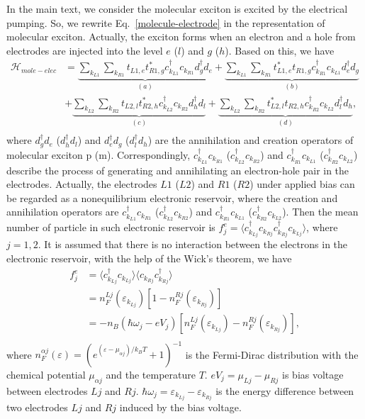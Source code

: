 \documentclass[aps,prb,
superscriptaddress,
,floatfix,footinbib,longbibliography,
preprint
]{revtex4-2}
\begin{document}
{In the main text, we consider the molecular exciton is excited by the electrical pumping. So, we rewrite Eq.~\ref{molecule-electrode} in the representation of molecular exciton. Actually, the exciton forms when an electron and a hole from electrodes are injected into the level $e$ ($l$) and $g$ ($h$). Based on this, we have
\begin{equation}
\begin{split}
\mathcal{H}_{mole-elec}&=\underbrace{\sum_{k_{L1}}\sum_{k_{R1}}t_{L1,e}t_{R1,g}^{\ast}c_{k_{L1}}^{\dagger}c_{k_{R1}}d_{g}^{\dagger}d_{e}}_{(a)}+\underbrace{\sum_{k_{L1}}\sum_{k_{R1}}t_{L1,e}^{\ast}t_{R1,g}c_{k_{R1}}^{\dagger}c_{k_{L1}}d_{e}^{\dagger}d_{g}}_{(b)}\\
&+\underbrace{\sum_{k_{L2}}\sum_{k_{R2}}t_{L2,l}t_{R2,h}^{\ast}c_{k_{L2}}^{\dagger}c_{k_{R2}}d_{h}^{\dagger}d_{l}}_{(c)}+\underbrace{\sum_{k_{L2}}\sum_{k_{R2}}t_{L2,l}^{\ast}t_{R2,h}c_{k_{R2}}^{\dagger}c_{k_{L2}}d_{l}^{\dagger}d_{h}}_{(d)},\\
\end{split}
\label{exciton-electrode}
\end{equation}
where $d_{g}^{\dagger}d_{e}$ ($d_{h}^{\dagger}d_{l}$) and $d_{e}^{\dagger}d_{g}$ ($d_{l}^{\dagger}d_{h}$) are the annihilation and creation operators of molecular exciton p (m). Correspondingly, $c_{k_{L1}}^{\dagger}c_{k_{R1}}$ ($c_{k_{L2}}^{\dagger}c_{k_{R2}}$) and  $c_{k_{R1}}^{\dagger}c_{k_{L1}}$ ($c_{k_{R2}}^{\dagger}c_{k_{L2}}$) describe the process of generating and annihilating an electron-hole pair in the electrodes. Actually, the electrodes $L1$ ($L2$) and $R1$ ($R2$) under applied bias can be regarded as a nonequilibrium electronic reservoir, where the creation and annihilation operators are $c_{k_{L1}}^{\dagger}c_{k_{R1}}$ ($c_{k_{L2}}^{\dagger}c_{k_{R2}}$) and  $c_{k_{R1}}^{\dagger}c_{k_{L1}}$ ($c_{k_{R2}}^{\dagger}c_{k_{L2}}$). Then the mean number of particle in such electronic reservoir is $f_{j}^{e}=\langle c_{k_{Lj}}^{\dagger}c_{k_{Rj}} c_{k_{Rj}}^{\dagger}c_{k_{Lj}}\rangle$, where $j=1,2$. It is assumed that there is no interaction between the electrons in the electronic reservoir, with the help of the Wick's theorem, we have
\begin{equation}
\begin{split}
f_{j}^{e}&=
\langle c_{k_{Lj}}^{\dagger}c_{k_{Lj}}\rangle \langle c_{k_{Rj}} c_{k_{Rj}}^{\dagger}\rangle\\
&=n_{F}^{Lj}(\varepsilon_{k_{Lj}})[1-n_{F}^{Rj}(\varepsilon_{k_{Rj}})]\\
&=-n_{B}(\hbar\omega_{j}-eV_{j})[n_{F}^{Lj}(\varepsilon_{k_{Lj}})-n_{F}^{Rj}(\varepsilon_{k_{Rj}})],\\
\end{split}
\end{equation}
where $n_{F}^{\alpha j}(\varepsilon)=(e^{(\varepsilon-\mu_{\alpha j})/k_{B}T}+1)^{-1}$ is the  Fermi-Dirac distribution with the chemical potential $\mu_{\alpha j}$ and the temperature $T$.  
$eV_{j}=\mu_{Lj}-\mu_{Rj}$ is bias voltage between electrodes $Lj$ and $Rj$. $\hbar\omega_{j}=\varepsilon_{k_{Lj}}-\varepsilon_{k_{Rj}}$ is the energy difference between two electrodes $Lj$ and $Rj$ induced by the bias voltage.

}
\end{document}
